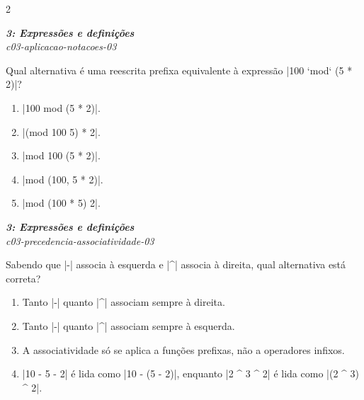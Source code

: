 \documentclass[a4paper,10pt,brazil]{article}
\begin{document}
\begin{multicols}{2}
\begin{flushright}
  \footnotesize
  \textit{\textbf{3: Expressões e definições}}\\
  \textit{c03-aplicacao-notacoes-03}\\

\end{flushright}
Qual alternativa é uma reescrita prefixa equivalente à expressão \haskellinline|100 `mod` (5 * 2)|?

\begin{enumerate}
  \item \haskellinline|100 mod (5 * 2)|.

  \item \haskellinline|(mod 100 5) * 2|.

  \item \haskellinline|mod 100 (5 * 2)|.

  \item \haskellinline|mod (100, 5 * 2)|.

  \item \haskellinline|mod (100 * 5) 2|.


\end{enumerate}

\begin{flushright}
  \footnotesize
  \textit{\textbf{3: Expressões e definições}}\\
  \textit{c03-precedencia-associatividade-03}\\

\end{flushright}
Sabendo que \haskellinline|-| associa à esquerda e \haskellinline|^| associa à direita, qual alternativa está correta?

\begin{enumerate}
  \item Tanto \haskellinline|-| quanto \haskellinline|^| associam sempre à direita.

  \item Tanto \haskellinline|-| quanto \haskellinline|^| associam sempre à esquerda.

  \item A associatividade só se aplica a funções prefixas, não a operadores infixos.

  \item \haskellinline|10 - 5 - 2| é lida como \haskellinline|10 - (5 - 2)|, enquanto \haskellinline|2 ^ 3 ^ 2| é lida como \haskellinline|(2 ^ 3) ^ 2|.


\end{enumerate}
\end{multicols}
\end{document}
